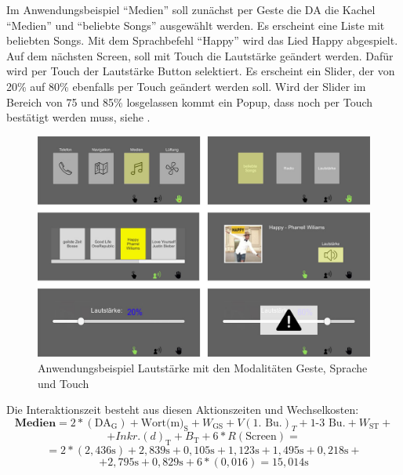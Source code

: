 Im Anwendungsbeispiel "`Medien"' soll zunächst per Geste die DA die Kachel "`Medien"' und "`beliebte Songs"' ausgewählt werden. 
Es erscheint eine Liste mit beliebten Songs. 
Mit dem Sprachbefehl "`Happy"' wird das Lied Happy abgespielt. 
Auf dem nächsten Screen, soll mit Touch die Lautstärke geändert werden. 
Dafür wird per Touch der Lautstärke Button selektiert. 
Es erscheint ein Slider, der von 20\% auf 80\% ebenfalls per Touch geändert werden soll. 
Wird der Slider im Bereich von 75 und 85\% losgelassen kommt ein Popup, dass noch per Touch bestätigt werden muss, siehe .
\begin{figure}
	\centering
		\includegraphics[width=1\textwidth]{img/UseCases_Eval_Medien.jpg}
	\caption{Anwendungsbeispiel Lautstärke mit den Modalitäten Geste, Sprache und Touch}
	\label{fig:UseCasesEvalMedien}
\end{figure}
Die Interaktionszeit besteht aus diesen Aktionszeiten und Wechselkosten:
\[
\textbf{Medien} = 2*(\text{DA}_\text{G}) + \text{Wort(m)}_\text{S} + W_\text{GS} + V(\text{1. Bu.})_T + \text{1-3 Bu.} + W_\text{ST} + 
\]
\[
 + Inkr.(d)_\text{T} + B_\text{T} + 6*R(\text{Screen}) =
\]
\[
= 2*( 2,436\text{s}) + 2,839\text{s} + 0,105\text{s} + 1,123\text{s} + 1,495\text{s} + 0,218\text{s} +
\]
\[
+2,795\text{s}+0,829\text{s} + 6*(0,016) = 15,014\text{s}
\]

